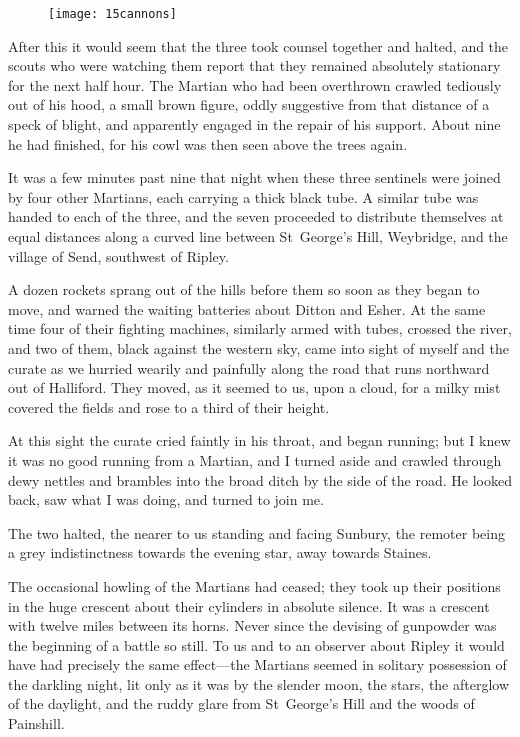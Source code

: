 \begin{figure}[tb!]
\centering
\texttt{[image: 15cannons]}
\end{figure}

After this it would seem that the three took counsel together and halted, and the scouts who were watching them report that they remained absolutely stationary for the next half hour. The Martian who had been overthrown crawled tediously out of his hood, a small brown figure, oddly suggestive from that distance of a speck of blight, and apparently engaged in the repair of his support. About nine he had finished, for his cowl was then seen above the trees again.

It was a few minutes past nine that night when these three sentinels were joined by four other Martians, each carrying a thick black tube. A similar tube was handed to each of the three, and the seven proceeded to distribute themselves at equal distances along a curved line between St~George's Hill, Weybridge, and the village of Send, southwest of Ripley.

A dozen rockets sprang out of the hills before them so soon as they began to move, and warned the waiting batteries about Ditton and Esher. At the same time four of their fighting machines, similarly armed with tubes, crossed the river, and two of them, black against the western sky, came into sight of myself and the curate as we hurried wearily and painfully along the road that runs northward out of Halliford. They moved, as it seemed to us, upon a cloud, for a milky mist covered the fields and rose to a third of their height.

At this sight the curate cried faintly in his throat, and began running; but I knew it was no good running from a Martian, and I turned aside and crawled through dewy nettles and brambles into the broad ditch by the side of the road. He looked back, saw what I was doing, and turned to join me.

The two halted, the nearer to us standing and facing Sunbury, the remoter being a grey indistinctness towards the evening star, away towards Staines.

The occasional howling of the Martians had ceased; they took up their positions in the huge crescent about their cylinders in absolute silence. It was a crescent with twelve miles between its horns. Never since the devising of gunpowder was the beginning of a battle so still. To us and to an observer about Ripley it would have had precisely the same effect—the Martians seemed in solitary possession of the darkling night, lit only as it was by the slender moon, the stars, the afterglow of the daylight, and the ruddy glare from St~George's Hill and the woods of Painshill.

